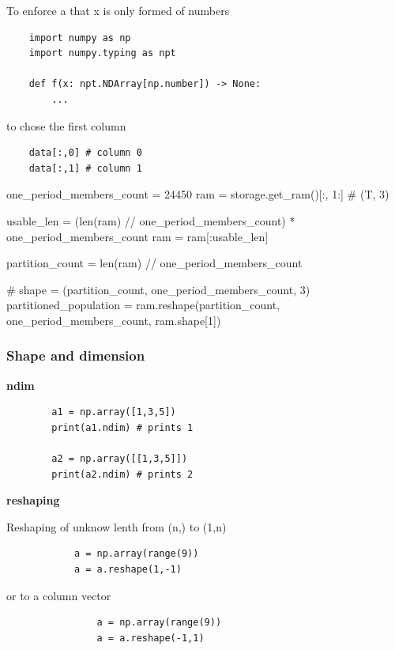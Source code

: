 \documentclass{book}
\providecommand{\ProjectDeepHeading}[2]{%
    \par\medskip\noindent\textbf{#2}\par\smallskip
}
\begin{document}

To enforce a that x is only formed of numbers
\begin{verbatim}
    import numpy as np
    import numpy.typing as npt
    
    def f(x: npt.NDArray[np.number]) -> None:
        ...
\end{verbatim}


to chose the first column
\begin{verbatim}
    data[:,0] # column 0
    data[:,1] # column 1
\end{verbatim}


one\_period\_members\_count = 24450
ram = storage.get\_ram()[:, 1:]  # (T, 3)

usable\_len = (len(ram) // one\_period\_members\_count) * one\_period\_members\_count
ram = ram[:usable\_len]

partition\_count = len(ram) // one\_period\_members\_count

# shape = (partition\_count, one\_period\_members\_count, 3)
partitioned\_population = ram.reshape(partition\_count, one\_period\_members\_count, ram.shape[1])

\subsubsection{Shape and dimension}


\ProjectDeepHeading{4}{ndim}
    \begin{verbatim}
        a1 = np.array([1,3,5])
        print(a1.ndim) # prints 1
        
        a2 = np.array([[1,3,5]])
        print(a2.ndim) # prints 2
    \end{verbatim}


\ProjectDeepHeading{4}{reshaping}
    Reshaping of unknow lenth from (n,) to (1,n)
    \begin{verbatim}
            a = np.array(range(9))
            a = a.reshape(1,-1)
    \end{verbatim}
    or to a column vector
    \begin{verbatim}
                a = np.array(range(9))
                a = a.reshape(-1,1)
    \end{verbatim}
\end{document}
